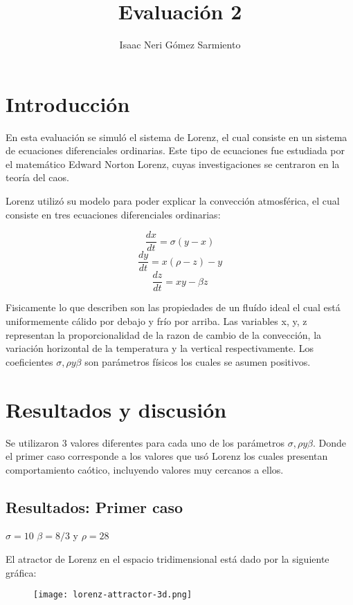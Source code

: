 \documentclass[a4paper]{article}
\title{Evaluación 2}
\author{Isaac Neri Gómez Sarmiento}
\begin{document}
\maketitle


\section{Introducción}
En esta evaluación se simuló el sistema de Lorenz, el cual consiste en un sistema de ecuaciones diferenciales ordinarias. Este tipo de ecuaciones fue estudiada por el matemático Edward Norton Lorenz, cuyas investigaciones se centraron en la teoría del caos.\

Lorenz utilizó su modelo para poder explicar la convección atmosférica, el cual consiste en tres ecuaciones diferenciales ordinarias:


\[\frac{dx}{dt}=\sigma(y-x)\]
\[\frac{dy}{dt}=x(\rho-z)-y\]
\[\frac{dz}{dt}=xy-\beta z\]

Fisicamente lo que describen son las propiedades de un fluído ideal el cual está uniformemente cálido por debajo y frío por arriba. Las variables x, y, z representan  la proporcionalidad de la razon de cambio de la convección, la variación horizontal de la temperatura y la vertical respectivamente. Los coeficientes $\sigma, \rho  y  \beta$ son parámetros físicos los cuales se asumen positivos.

\section{Resultados y discusión}

Se utilizaron 3 valores diferentes para cada uno de los parámetros $\sigma, \rho y \beta$. Donde el primer caso corresponde a los valores que usó Lorenz los cuales presentan comportamiento caótico, incluyendo valores muy cercanos a ellos.

\subsection{Resultados: Primer caso}

\begin{center}
$\sigma=10$ $\beta=8/3$ y $\rho=28$
\end{center}

El atractor de Lorenz en el espacio tridimensional está dado por la siguiente gráfica:

\begin{figure}[ht!]
\centering
\texttt{[image: lorenz-attractor-3d.png]}
\end{figure}
\end{document}
